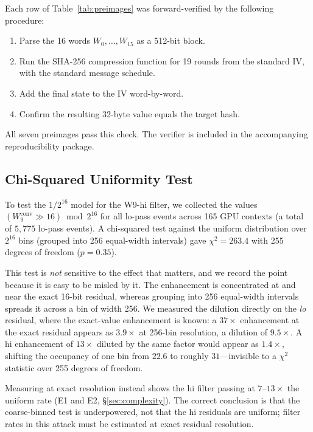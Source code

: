 \documentclass[11pt,a4paper]{article}
\begin{document}
Each row of Table~\ref{tab:preimages} was forward-verified by
the following procedure:
\begin{enumerate}
  \item Parse the 16 words $W_0,\ldots,W_{15}$ as a 512-bit block.
  \item Run the SHA-256 compression function for 19 rounds from the
    standard IV, with the standard message schedule.
  \item Add the final state to the IV word-by-word.
  \item Confirm the resulting 32-byte value equals the target hash.
\end{enumerate}
All seven preimages pass this check.  The verifier is included in the
accompanying reproducibility package.

\subsection{Chi-Squared Uniformity Test}
\label{sec:chi2}

To test the $1/2^{16}$ model for the W9-hi filter, we collected
the values $(W_9^{\mathrm{conv}} \gg 16) \bmod 2^{16}$ for all
lo-pass events across 165 GPU contexts (a total of $5{,}775$ lo-pass
events).  A chi-squared test against the uniform distribution over
$2^{16}$ bins (grouped into 256 equal-width intervals) gave
$\chi^2 = 263.4$ with 255 degrees of freedom ($p = 0.35$).

This test is \emph{not} sensitive to the effect that matters, and we record the
point because it is easy to be misled by it.  The enhancement is concentrated
at and near the exact 16-bit residual, whereas grouping into 256
equal-width intervals spreads it across a bin of width 256.  We measured
the dilution directly on the \emph{lo} residual, where the exact-value
enhancement is known: a $37\times$ enhancement at the exact residual
appears as $3.9\times$ at 256-bin resolution, a dilution of $9.5\times$.
A hi enhancement of $13\times$ diluted by the same factor would appear as
$1.4\times$, shifting the occupancy of one bin from $22.6$ to roughly
$31$---invisible to a $\chi^2$ statistic over 255 degrees of freedom.

Measuring at exact resolution instead shows the hi filter passing at
$7$--$13\times$ the uniform rate (E1 and E2, \S\ref{sec:complexity}).  The correct
conclusion is that the coarse-binned test is underpowered, not that the hi
residuals are uniform; filter rates in this attack must be estimated at exact
residual resolution.
\end{document}
